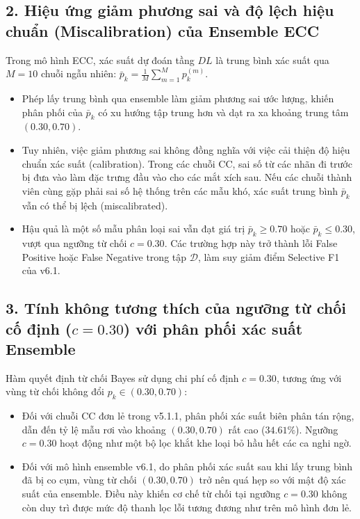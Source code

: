 \documentclass[11pt,a4paper]{article}
\begin{document}
\subsection{2. Hiệu ứng giảm phương sai và độ lệch hiệu chuẩn (Miscalibration) của Ensemble ECC}
Trong mô hình ECC, xác suất dự đoán tầng $DL$ là trung bình xác suất qua $M = 10$ chuỗi ngẫu nhiên: $\bar{p}_k = \frac{1}{M} \sum_{m=1}^M p_k^{(m)}$.
\begin{itemize}
    \item Phép lấy trung bình qua ensemble làm giảm phương sai ước lượng, khiến phân phối của $\bar{p}_k$ có xu hướng tập trung hơn và dạt ra xa khoảng trung tâm $(0.30, 0.70)$.
    \item Tuy nhiên, việc giảm phương sai không đồng nghĩa với việc cải thiện độ hiệu chuẩn xác suất (calibration). Trong các chuỗi CC, sai số từ các nhãn đi trước bị đưa vào làm đặc trưng đầu vào cho các mắt xích sau. Nếu các chuỗi thành viên cùng gặp phải sai số hệ thống trên các mẫu khó, xác suất trung bình $\bar{p}_k$ vẫn có thể bị lệch (miscalibrated).
    \item Hậu quả là một số mẫu phân loại sai vẫn đạt giá trị $\bar{p}_k \ge 0.70$ hoặc $\bar{p}_k \le 0.30$, vượt qua ngưỡng từ chối $c = 0.30$. Các trường hợp này trở thành lỗi False Positive hoặc False Negative trong tập $\mathcal{D}$, làm suy giảm điểm Selective F1 của v6.1.
\end{itemize}

\subsection{3. Tính không tương thích của ngưỡng từ chối cố định (\texorpdfstring{$c = 0.30$}{c = 0.30}) với phân phối xác suất Ensemble}
Hàm quyết định từ chối Bayes sử dụng chi phí cố định $c = 0.30$, tương ứng với vùng từ chối không đổi $p_k \in (0.30, 0.70)$:
\begin{itemize}
    \item Đối với chuỗi CC đơn lẻ trong v5.1.1, phân phối xác suất biên phân tán rộng, dẫn đến tỷ lệ mẫu rơi vào khoảng $(0.30, 0.70)$ rất cao ($34.61\%$). Ngưỡng $c = 0.30$ hoạt động như một bộ lọc khắt khe loại bỏ hầu hết các ca nghi ngờ.
    \item Đối với mô hình ensemble v6.1, do phân phối xác suất sau khi lấy trung bình đã bị co cụm, vùng từ chối $(0.30, 0.70)$ trở nên quá hẹp so với mật độ xác suất của ensemble. Điều này khiến cơ chế từ chối tại ngưỡng $c = 0.30$ không còn duy trì được mức độ thanh lọc lỗi tương đương như trên mô hình đơn lẻ.
\end{itemize}
\end{document}
